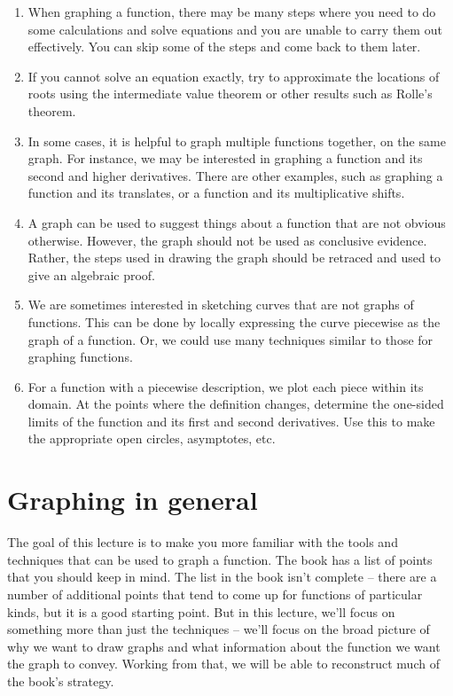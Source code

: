 \documentclass[10pt]{amsart}
\begin{document}
\begin{enumerate}
\item When graphing a function, there may be many steps where you need
  to do some calculations and solve equations and you are unable to
  carry them out effectively. You can skip some of the steps and come
  back to them later.
\item If you cannot solve an equation exactly, try to approximate the
  locations of roots using the intermediate value theorem or other
  results such as Rolle's theorem.
\item In some cases, it is helpful to graph multiple functions
  together, on the same graph. For instance, we may be interested in
  graphing a function and its second and higher derivatives. There are
  other examples, such as graphing a function and its translates, or a
  function and its multiplicative shifts.
\item A graph can be used to suggest things about a function that are
  not obvious otherwise. However, the graph should not be used as
  conclusive evidence. Rather, the steps used in drawing the graph
  should be retraced and used to give an algebraic proof.
\item We are sometimes interested in sketching curves that are not
  graphs of functions. This can be done by locally expressing the
  curve piecewise as the graph of a function. Or, we could use many
  techniques similar to those for graphing functions.
\item For a function with a piecewise description, we plot each piece
  within its domain. At the points where the definition changes,
  determine the one-sided limits of the function and its first and
  second derivatives. Use this to make the appropriate open circles,
  asymptotes, etc.
\end{enumerate}

\section{Graphing in general}

The goal of this lecture is to make you more familiar with the tools
and techniques that can be used to graph a function. The book has a
list of points that you should keep in mind. The list in the book
isn't complete -- there are a number of additional points that tend
to come up for functions of particular kinds, but it is a good
starting point. But in this lecture, we'll focus on something more
than just the techniques -- we'll focus on the broad picture of why we
want to draw graphs and what information about the function we want
the graph to convey. Working from that, we will be able to reconstruct
much of the book's strategy.
\end{document}
